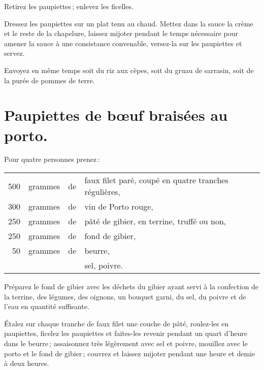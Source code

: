 Retirez les paupiettes ; enlevez les ficelles.

Dressez les paupiettes sur un plat tenu au chaud. Mettez dans la sauce la crème
et le reste de la chapelure, laissez mijoter pendant le temps nécessaire pour
amener la sauce à une consistance convenable, versez-la sur les paupiettes et
servez.

Envoyez en même temps soit du riz aux cèpes, soit du gruau de sarrasin, soit
de la purée de pommes de terre.

\section*{\centering Paupiettes de bœuf braisées au porto.}
{}

Pour quatre personnes prenez :

\medskip

\footnotesize
\begin{longtable}{rrrp{16em}}
    500 & grammes & de & faux filet paré, coupé en quatre tranches régulières,                            \\
    300 & grammes & de & vin de Porto rouge,                                                              \\
    250 & grammes & de & pâté de gibier, en terrine, truffé ou non,                                       \\
    250 & grammes & de & fond de gibier,                                                                  \\
     50 & grammes & de & beurre,                                                                          \\
        &         &    & sel, poivre.                                                                     \\
\end{longtable}
\normalsize

Préparez le fond de gibier avec les déchets du gibier ayant servi à la confection
de la terrine, des légumes, des oignons, un bouquet garni, du sel, du poivre et de
l'eau en quantité suffisante.

Étalez sur chaque tranche de faux filet une couche de pâté, roulez-les en
paupiettes, ficelez les paupiettes et faites-les revenir pendant un quart
d'heure dans le beurre ; assaisonnez très légèrement avec sel et poivre,
mouillez avec le porto et le fond de gibier ; couvrez et laissez mijoter
pendant une heure et demie à deux heures.

